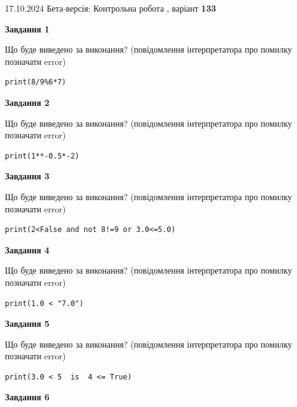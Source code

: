 \documentclass[12pt, ukrainian]{article}
\begin{document}
{\Large{17.10.2024 Бета-версія: Контрольна робота , варіант  \No \textbf { 133 }\par}}
{
\begin {large}
{\begin {center}\textbf{Завдання 1}\end {center}}

Що буде виведено за виконання? (повідомлення інтерпретатора про помилку позначати error)\par
\begin{verbatim}
print(8/9%6*7)
\end{verbatim}

{\begin {center}\textbf{Завдання 2}\end {center}}

Що буде виведено за виконання? (повідомлення інтерпретатора про помилку позначати error)\par
\begin{verbatim}
print(1**-0.5*-2)
\end{verbatim}

{\begin {center}\textbf{Завдання 3}\end {center}}

Що буде виведено за виконання? (повідомлення інтерпретатора про помилку позначати error)\par
\begin{verbatim}
print(2<False and not 8!=9 or 3.0<=5.0)
\end{verbatim}

{\begin {center}\textbf{Завдання 4}\end {center}}

Що буде виведено за виконання? (повідомлення інтерпретатора про помилку позначати error)\par
\begin{verbatim}
print(1.0 < "7.0")
\end{verbatim}

{\begin {center}\textbf{Завдання 5}\end {center}}

Що буде виведено за виконання? (повідомлення інтерпретатора про помилку позначати error)\par
\begin{verbatim}
print(3.0 < 5  is  4 <= True)
\end{verbatim}

{\begin {center}\textbf{Завдання 6}\end {center}}


\end{large}}
\end{document}
